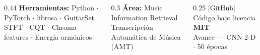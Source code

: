\documentclass[final]{beamer}
\begin{document}
\begin{frame}[t]{}
\begin{tcolorbox}[
  enhanced, colback=darkblue, colframe=darkblue,
  arc=0pt, boxrule=0pt,
  left=16pt, right=16pt, top=6pt, bottom=6pt
]
\begin{columns}[c]
  \begin{column}{0.44\linewidth}
    {\color{white}\small\textbf{Herramientas:} Python $\cdot$ PyTorch $\cdot$ librosa $\cdot$ GuitarSet}\\
    {\color{white!70!darkblue}\small STFT $\cdot$ CQT $\cdot$ Chroma features $\cdot$ Energ\'ia arm\'onicos}
  \end{column}
  \begin{column}{0.3\linewidth}
    \centering
    {\color{accentgold}\small\textbf{\'Area:} Music Information Retrieval}\\
    {\color{white!70!darkblue}\small Transcripci\'on Autom\'atica de M\'usica (AMT)}
  \end{column}
  \begin{column}{0.25\linewidth}
    \raggedleft
    {\color{white}\small [GitHub] C\'odigo bajo licencia \textbf{MIT}}\\
    {\color{white!70!darkblue}\small Avance --- CNN 2-D $\cdot$ 50 \'epocas}
  \end{column}
\end{columns}
\end{tcolorbox}

\end{frame}
\end{document}
